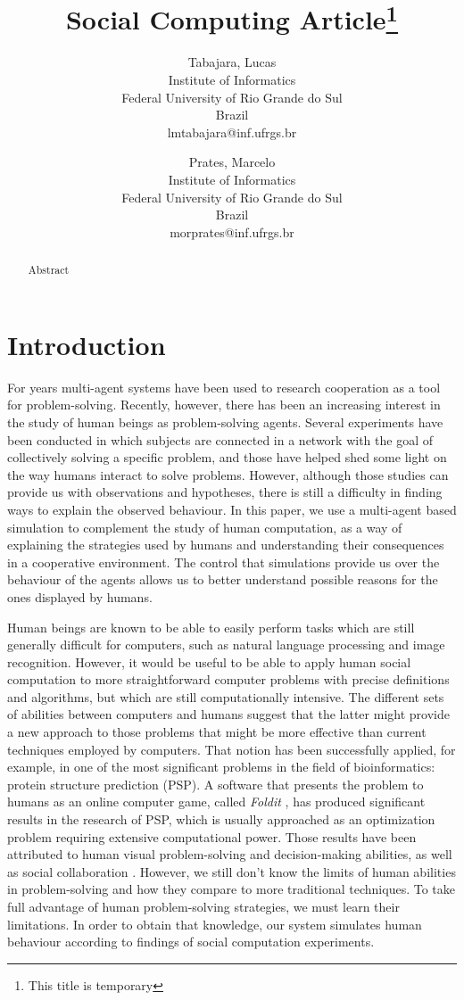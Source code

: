 \documentclass{article}
\title{Social Computing Article\thanks{This title is temporary}}
\author{Tabajara, Lucas \\
Institute of Informatics \\
Federal University of Rio Grande do Sul\\
Brazil \\
lmtabajara@inf.ufrgs.br
\and
Prates, Marcelo \\
Institute of Informatics \\
Federal University of Rio Grande do Sul\\
Brazil \\
morprates@inf.ufrgs.br}
\begin{document}
\maketitle

\begin{abstract}
  Abstract
\end{abstract}

\section{Introduction}

For years multi-agent systems have been used to research cooperation as a tool for problem-solving. Recently, however, there has been an increasing interest in the study of human beings as problem-solving agents. Several experiments have been conducted in which subjects are connected in a network with the goal of collectively solving a specific problem, and those have helped shed some light on the way humans interact to solve problems. However, although those studies can provide us with observations and hypotheses, there is still a difficulty in finding ways to explain the observed behaviour. In this paper, we use a multi-agent based simulation to complement the study of human computation, as a way of explaining the strategies used by humans and understanding their consequences in a cooperative environment. The control that simulations provide us over the behaviour of the agents allows us to better understand possible reasons for the ones displayed by humans.

Human beings are known to be able to easily perform tasks which are still generally difficult for computers, such as natural language processing and image recognition. However, it would be useful to be able to apply human social computation to more straightforward computer problems with precise definitions and algorithms, but which are still computationally intensive. The different sets of abilities between computers and humans suggest that the latter might provide a new approach to those problems that might be more effective than current techniques employed by computers. That notion has been successfully applied, for example, in one of the most significant problems in the field of bioinformatics: protein structure prediction (PSP). A software that presents the problem to humans as an online computer game, called \emph{Foldit} \cite{cooper:foldit}, has produced significant results in the research of PSP, which is usually approached as an optimization problem requiring extensive computational power. Those results have been attributed to human visual problem-solving and decision-making abilities, as well as social collaboration \cite{cooper:foldit}. However, we still don't know the limits of human abilities in problem-solving and how they compare to more traditional techniques. To take full advantage of human problem-solving strategies, we must learn their limitations. In order to obtain that knowledge, our system simulates human behaviour according to findings of social computation experiments.
\end{document}
